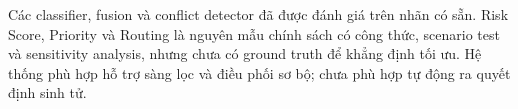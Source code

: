\begin{insight}
Các classifier, fusion và conflict detector đã được đánh giá trên nhãn có sẵn.
Risk Score, Priority và Routing là nguyên mẫu chính sách có công thức, scenario
test và sensitivity analysis, nhưng chưa có ground truth để khẳng định tối ưu.
Hệ thống phù hợp hỗ trợ sàng lọc và điều phối sơ bộ; chưa phù hợp tự động ra
quyết định sinh tử.
\end{insight}
